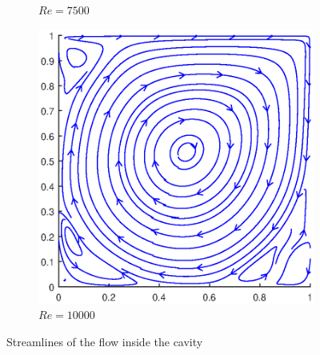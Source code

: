 \begin{figure}
\begin{subfigure}{0.5\textwidth}
		\caption{$Re=7500$}
	\end{subfigure}
	\begin{subfigure}{0.5\textwidth}
		\centering
		\includegraphics[scale=0.61]{DrivenCavity/10000}
		\caption{$Re=10000$}
	\end{subfigure}
	\caption{Streamlines of the flow inside the cavity}
\end{figure}